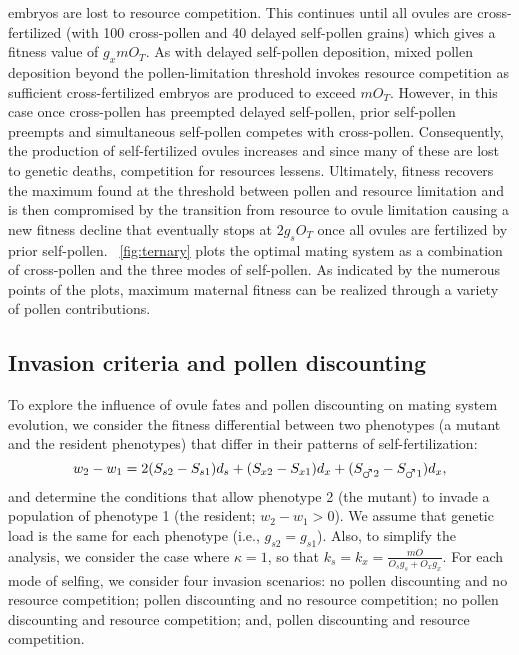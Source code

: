 \documentclass[letterpaper,titlepage]{scrartcl}
\begin{document}
embryos are lost to resource competition. This continues until all
ovules are cross-fertilized (with 100 cross-pollen and 40 delayed
self-pollen grains) which gives a fitness value of $g_{x}mO_{T}$. As
with delayed self-pollen deposition, mixed pollen deposition beyond
the pollen-limitation threshold invokes resource competition as
sufficient cross-fertilized embryos are produced to exceed
$mO_{T}$. However, in this case once cross-pollen has preempted
delayed self-pollen, prior self-pollen preempts and simultaneous
self-pollen competes with cross-pollen. Consequently, the production
of self-fertilized ovules increases and since many of these are lost
to genetic deaths, competition for resources lessens. Ultimately,
fitness recovers the maximum found at the threshold between pollen and
resource limitation and is then compromised by the transition from
resource to ovule limitation causing a new fitness decline that
eventually stops at $2g_{s}O_{T}$ once all ovules are fertilized by
prior self-pollen. {\fref}~\ref{fig:ternary} plots the optimal mating
system as a combination of cross-pollen and the three modes of
self-pollen. As indicated by the numerous points of the plots, maximum
maternal fitness can be realized through a variety of pollen
contributions.

\subsection{Invasion criteria and pollen discounting}
To explore the influence of ovule fates and pollen discounting on
mating system evolution, we consider the fitness differential between
two phenotypes (a mutant and the resident phenotypes) that differ in
their patterns of self-fertilization:
\begin{equation}\label{eq:differential}
  w_{2}-w_{1}=2(S_{s2}-S_{s1})d_{s}+(S_{x2}-S_{x1})d_{x}+(S_{\mars2}-S_{\mars1})d_{x},
\end{equation}
and determine the conditions that allow phenotype 2 (the mutant) to
invade a population of phenotype 1 (the resident; $w_{2}-w_{1}>0$). We
assume that genetic load is the same for each phenotype (i.e.,
$g_{s2}=g_{s1}$). Also, to simplify the analysis, we consider the case
where $\kappa =1$, so that
$k_{s}=k_{x}=\frac{mO}{O_{s}g_{s}+O_{x}g_{x}}$. For each mode of
selfing, we consider four invasion scenarios: no pollen discounting
and no resource competition; pollen discounting and no resource
competition; no pollen discounting and resource competition; and,
pollen discounting and resource competition.
\end{document}
